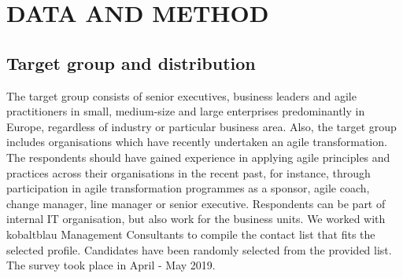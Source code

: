 \documentclass{article}
\begin{document}

\section{DATA AND METHOD}
\label{sec:data-collection}

\subsection {Target group and distribution}

The target group consists of senior executives, business leaders and agile practitioners in small, medium-size and large enterprises predominantly in Europe, regardless of industry or particular business area. Also, the target group includes organisations which have recently undertaken an agile transformation. The respondents should have gained experience in applying agile principles and practices across their organisations in the recent past, for instance, through participation in agile transformation programmes as a sponsor, agile coach, change manager, line manager or senior executive. Respondents can be part of internal IT organisation, but also work for the business units. We worked with kobaltblau Management Consultants to compile the contact list that fits the selected profile. Candidates have been randomly selected from the provided list. The survey took place in April - May 2019.
\end{document}
